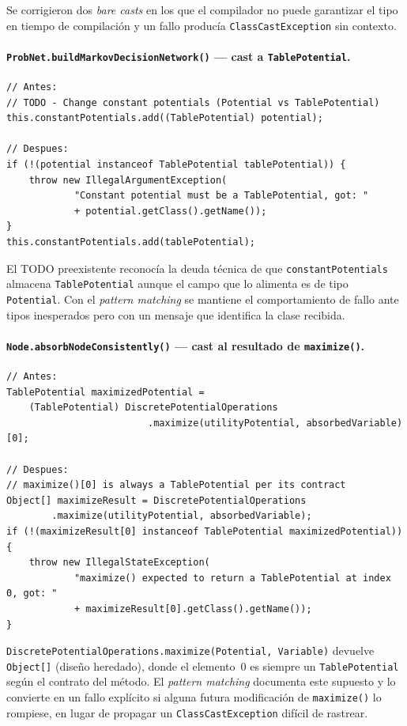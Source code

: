 \documentclass[11pt,a4paper]{article}
\newcommand{\code}[1]{\texttt{#1}}
\begin{document}
Se corrigieron dos \emph{bare casts} en los que el compilador no
puede garantizar el tipo en tiempo de compilación y un fallo
producía \code{ClassCastException} sin contexto.

\paragraph{\code{ProbNet.buildMarkovDecisionNetwork()} --- cast a \code{TablePotential}.}

\begin{lstlisting}
// Antes:
// TODO - Change constant potentials (Potential vs TablePotential)
this.constantPotentials.add((TablePotential) potential);

// Despues:
if (!(potential instanceof TablePotential tablePotential)) {
    throw new IllegalArgumentException(
            "Constant potential must be a TablePotential, got: "
            + potential.getClass().getName());
}
this.constantPotentials.add(tablePotential);
\end{lstlisting}

El TODO preexistente reconocía la deuda técnica de que
\code{constantPotentials} almacena \code{TablePotential} aunque el
campo que lo alimenta es de tipo \code{Potential}. Con el
\emph{pattern matching} se mantiene el comportamiento de fallo ante
tipos inesperados pero con un mensaje que identifica la clase recibida.

\paragraph{\code{Node.absorbNodeConsistently()} --- cast al resultado de \code{maximize()}.}

\begin{lstlisting}
// Antes:
TablePotential maximizedPotential =
    (TablePotential) DiscretePotentialOperations
                         .maximize(utilityPotential, absorbedVariable)[0];

// Despues:
// maximize()[0] is always a TablePotential per its contract
Object[] maximizeResult = DiscretePotentialOperations
        .maximize(utilityPotential, absorbedVariable);
if (!(maximizeResult[0] instanceof TablePotential maximizedPotential)) {
    throw new IllegalStateException(
            "maximize() expected to return a TablePotential at index 0, got: "
            + maximizeResult[0].getClass().getName());
}
\end{lstlisting}

\code{DiscretePotentialOperations.maximize(Potential, Variable)} devuelve
\code{Object[]} (diseño heredado), donde el elemento~0 es siempre un
\code{TablePotential} según el contrato del método. El \emph{pattern
matching} documenta este supuesto y lo convierte en un fallo explícito
si alguna futura modificación de \code{maximize()} lo rompiese, en lugar
de propagar un \code{ClassCastException} difícil de rastrear.
\end{document}
